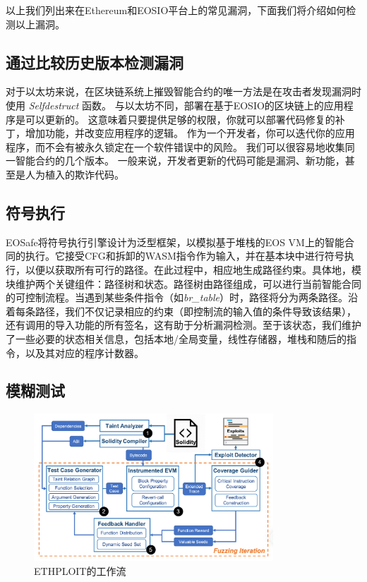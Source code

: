 \documentclass{SCIS2022cn}
\begin{document}
以上我们列出来在Ethereum和EOSIO平台上的常见漏洞，下面我们将介绍如何检测以上漏洞。

\subsection{通过比较历史版本检测漏洞}

对于以太坊来说，在区块链系统上摧毁智能合约的唯一方法是在攻击者发现漏洞时使用 \textit{Selfdestruct} 函数。
与以太坊不同，部署在基于EOSIO的区块链上的应用程序是可以更新的。
这意味着只要提供足够的权限，你就可以部署代码修复的补丁，增加功能，并改变应用程序的逻辑。
作为一个开发者，你可以迭代你的应用程序，而不会有被永久锁定在一个软件错误中的风险。
我们可以很容易地收集同一智能合约的几个版本。
一般来说，开发者更新的代码可能是漏洞、新功能，甚至是人为植入的欺诈代码。

\subsection{符号执行}

EOSafe将符号执行引擎设计为泛型框架，以模拟基于堆栈的EOS VM上的智能合同的执行。它接受CFG和拆卸的WASM指令作为输入，并在基本块中进行符号执行，以便以获取所有可行的路径。在此过程中，相应地生成路径约束。具体地，模块维护两个关键组件：路径树和状态。路径树由路径组成，可以进行当前智能合同的可控制流程。当遇到某些条件指令（如\textit{br\_table}）时，路径将分为两条路径。沿着每条路径，我们不仅记录相应的约束（即控制流的输入值的条件导致该结果），还有调用的导入功能的所有签名，这有助于分析漏洞检测。至于该状态，我们维护了一些必要的状态相关信息，包括本地/全局变量，线性存储器，堆栈和随后的指令，以及其对应的程序计数器。

\subsection{模糊测试}

\begin{figure}[htbp]
    \centering
    \includegraphics[width=0.8\textwidth]{image/pic2.png}
    \caption{ETHPLOIT的工作流}
    \label{pic2}
\end{figure}
\end{document}
